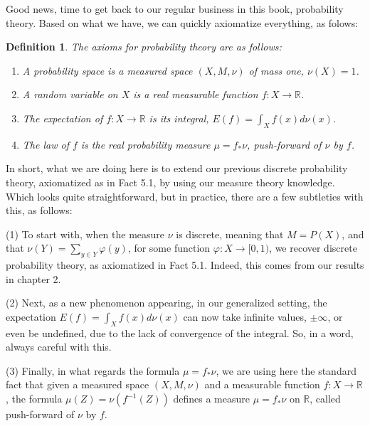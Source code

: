 \documentclass[12pt]{amsbook}
\newtheorem{definition}[theorem]{Definition}
\begin{document}
Good news, time to get back to our regular business in this book, probability theory. Based on what we have, we can quickly axiomatize everything, as folows:

\begin{definition}
The axioms for probability theory are as follows:
\begin{enumerate}
\item A probability space is a measured space $(X,M,\nu)$ of mass one, $\nu(X)=1$.

\item A random variable on $X$ is a real measurable function $f:X\to\mathbb R$.

\item The expectation of $f:X\to\mathbb R$ is its integral, $E(f)=\int_Xf(x)d\nu(x)$.

\item The law of $f$ is the real probability measure $\mu=f_*\nu$, push-forward of $\nu$ by $f$.
\end{enumerate}
\end{definition}

In short, what we are doing here is to extend our previous discrete probability theory, axiomatized as in Fact 5.1, by using our measure theory knowledge. Which looks quite straightforward, but in practice, there are a few subtleties with this, as follows:

\bigskip

(1) To start with, when the measure $\nu$ is discrete, meaning that $M=P(X)$, and that $\nu(Y)=\sum_{y\in Y}\varphi(y)$, for some function $\varphi:X\to[0,1)$, we recover discrete probability theory, as axiomatized in Fact 5.1. Indeed, this comes from our results in chapter 2.

\bigskip

(2) Next, as a new phenomenon appearing, in our generalized setting, the expectation $E(f)=\int_Xf(x)d\nu(x)$ can now take infinite values, $\pm\infty$, or even be undefined, due to the lack of convergence of the integral. So, in a word, always careful with this.

\bigskip

(3) Finally, in what regards the formula $\mu=f_*\nu$, we are using here the standard fact that given a measured space $(X,M,\nu)$ and a measurable function $f:X\to\mathbb R$, the formula $\mu(Z)=\nu(f^{-1}(Z))$ defines a measure $\mu=f_*\nu$ on $\mathbb R$, called push-forward of $\nu$ by $f$.

\bigskip
\end{document}
